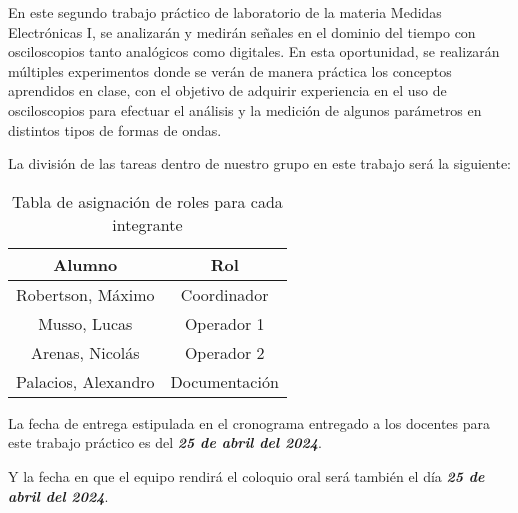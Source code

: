 En este segundo trabajo práctico de laboratorio de la materia Medidas Electrónicas I, se analizarán y medirán señales en el dominio del tiempo con osciloscopios tanto analógicos como digitales. En esta oportunidad, se realizarán múltiples experimentos donde se verán de manera práctica los conceptos aprendidos en clase, con el objetivo de adquirir experiencia en el uso de osciloscopios para efectuar el análisis y la medición de algunos parámetros en distintos tipos de formas de ondas.

La división de las tareas dentro de nuestro grupo en este trabajo será la siguiente: 

\begin{table}[h!]
    \centering
    \begin{tabular}{|c|c|}
    \hline
        Alumno & Rol \\
    \hline
        Robertson, Máximo & Coordinador \\ 
        Musso, Lucas & Operador 1 \\
        Arenas, Nicolás & Operador 2 \\
        Palacios, Alexandro & Documentación \\
    \hline
        \end{tabular}
        \def\tablename{Tabla} 
        \caption{Tabla de asignación de roles para cada integrante}
        \label{tab:roles}
\end{table}

La fecha de entrega estipulada en el cronograma entregado a los docentes para este trabajo práctico es del \textbf{\textit{25 de abril del 2024}}.

Y la fecha en que el equipo rendirá el coloquio oral será también el día \textbf{\textit{25 de abril del 2024}}.



